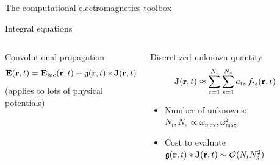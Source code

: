 \documentclass[aspectratio=169, usenames, dvipsnames]{beamer}
\begin{document}
\begin{frame}{The computational electromagnetics toolbox}
  \begin{center}
    
  \end{center}
\end{frame}

\begin{frame}{Integral equations}
  \begin{columns}
    \begin{block}{Convolutional propagation}
      \begin{equation*}
        \vb{E}(\vb{r}, t) = \vb{E}_\text{inc}(\vb{r}, t) + \mathfrak{g}(\vb{r}, t) * \vb{J}(\vb{r}, t)
      \end{equation*}
      \hfill \tiny{(applies to lots of physical potentials)}
    \end{block}

    \begin{block}{Discretized unknown quantity}
      \begin{equation*}
        \vb{J}(\vb{r}, t) \approx \sum_{t=1}^{N_t} \sum_{s=1}^{N_s} a_{ts} \, f_{ts}(\vb{r}, t)
      \end{equation*}
      \begin{itemize}
        \item Number of unknowns: $N_t, N_s \propto \omega_\text{max}, \omega_\text{max}^2$
        \item Cost to evaluate $\mathfrak{g}(\vb{r}, t) * \vb{J}(\vb{r}, t) \sim \mathcal{O}(N_t N_s^2)$
      \end{itemize}
    \end{block}

      \begin{center}
        
      \end{center}
  \end{columns}
\end{frame}
\end{document}
